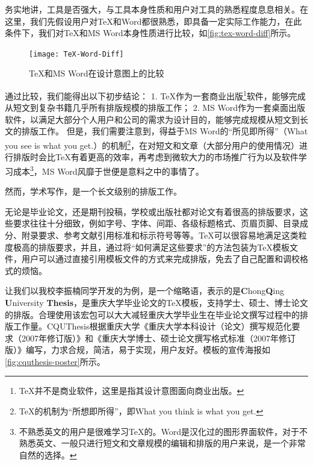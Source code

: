 务实地讲，工具是否强大，与工具本身性质和用户对工具的熟悉程度息息相关。在这里，我们先假设用户对\TeX 和Word都很熟悉，即具备一定实际工作能力，在此条件下，我们对\TeX 和MS Word本身性质进行比较，如\autoref{fig:tex-word-diff}所示。

\begin{figure}[tbh]
\centering
\texttt{[image: TeX-Word-Diff]}
\caption{\TeX 和MS Word在设计意图上的比较}
\label{fig:tex-word-diff}
\end{figure}

通过比较，我们能得出以下初步结论：
1. \TeX 作为一套商业出版\footnote{\TeX 并不是商业软件，这里是指其设计意图面向商业出版。}软件，能够完成从短文到复杂书籍几乎所有排版规模的排版工作；
2. MS Word作为一套桌面出版软件，以满足大部分个人用户和公司的需求为设计目的，能够完成规模从短文到长文的排版工作。
但是，我们需要注意到，得益于MS Word的“所见即所得”（What you see is what you get.）的机制\footnote{\TeX 的机制为“所想即所得”，即What you think is what you get.}，在对短文和文章（大部分用户的使用情况）进行排版时会比\TeX 有着更高的效率，再考虑到微软大力的市场推广行为以及软件学习成本\footnote{不熟悉英文的用户是很难学习\TeX 的。Word是汉化过的图形界面软件，对于不熟悉英文、一般只进行短文和文章规模的编辑和排版的用户来说，是一个非常自然的选择。}，MS Word风靡于世便是意料之中的事情了。

然而，学术写作，是一个长文级别的排版工作。

无论是毕业论文，还是期刊投稿，学校或出版社都对论文有着很高的排版要求，这些要求往往十分细致，例如字号、字体、间距、各级标题格式、页眉页脚、目录成分、附录要求、参考文献引用标准和标示符号等等。\TeX 可以很容易地满足这类粒度极高的排版要求，并且，通过将“如何满足这些要求”的方法包装为\TeX 模板文件，用户可以通过直接引用模板文件的方式来完成排版，免去了自己配置和调校格式的烦恼。

让我们以我校李振楠同学开发的\cquthesis 为例，\cquthesis 是一个缩略语，表示的是\textbf{C}hong\textbf{Q}ing \textbf{U}niversity \textbf{Thesis}，是重庆大学毕业论文的\TeX 模板，支持学士、硕士、博士论文的排版。合理使用该宏包可以大大减轻重庆大学毕业生在毕业论文撰写过程中的排版工作量。CQUThesis根据重庆大学《重庆大学本科设计（论文）撰写规范化要求（2007年修订版）》和《重庆大学博士、硕士论文撰写格式标准（2007年修订版）》编写，力求合规，简洁，易于实现，用户友好。模板的宣传海报如\autoref{fig:cquthesis-poster}所示。

